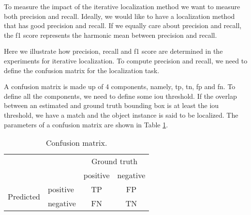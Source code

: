 To measure the impact of the iterative localization method we want to measure both precision and recall. Ideally, we would like to have a localization method that has good precision and recall. If we equally care about precision and recall, the f1 score represents the harmonic mean between precision and recall.

Here we illustrate how precision, recall and f1 score are determined in the experiments for iterative localization. To compute precision and recall, we need to define the confusion matrix for the localization task. 

A confusion matrix is made up of 4 components, namely, \acrfull{tp}, \acrfull{tn}, \acrfull{fp} and \acrfull{fn}. To define all the components, we need to define some \acrshort{iou} threshold. If the overlap between an estimated and ground truth bounding box is at least the \acrshort{iou} threshold, we have a match and the object instance is said to be localized. The parameters of a confusion matrix are shown in Table \ref{tab:confusion_matrix}.
\begin{table}[ht]
\centering
\begin{tabular}{l|l|c|c|}
\multicolumn{2}{c}{} & \multicolumn{2}{c}{Ground truth} \\
\cline{3-4}
\multicolumn{2}{c|}{} & positive & negative \\
\cline{2-4}
\multirow{2}{*}{Predicted} & positive & TP & FP \\
\cline{2-4}
                           & negative & FN & TN \\
\cline{2-4}
\end{tabular}
\caption[Confusion matrix]{Confusion matrix.}
\label{tab:confusion_matrix}
\end{table}

